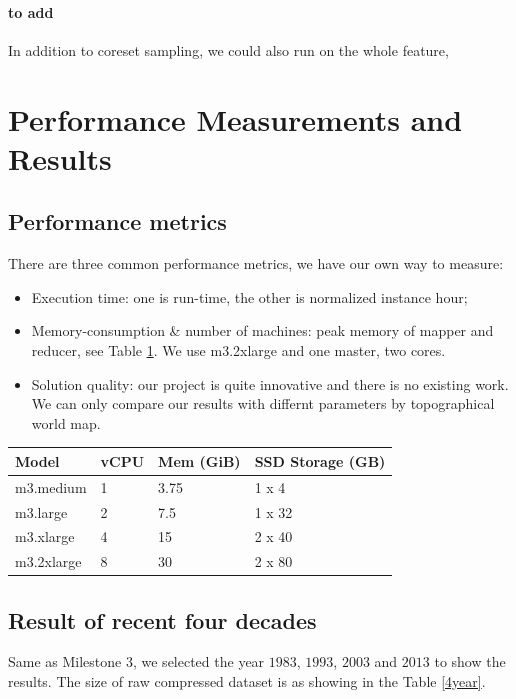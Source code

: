 \paragraph{to add}
In addition to coreset sampling, we could also run on the whole feature, 

\section{Performance Measurements and Results}

\subsection{Performance metrics}
There are three common performance metrics, we have our own way to measure:
\begin{itemize}
    \item Execution time: one is run-time, the other is normalized instance hour;
    \item Memory-consumption \& number of machines: peak memory of mapper and reducer, see Table \ref{table:m3}. We use m3.2xlarge and one master, two cores.
    \item Solution quality: our project is quite innovative and there is no existing work. We can only compare our results with differnt parameters by topographical world map\cite{world}.
\end{itemize}

\begin{table}
    \centering
    \label{table:m3}
    \begin{tabular}{|l|l|l|l|}
        \hline
        Model & vCPU & Mem (GiB) & SSD Storage (GB) \\
        \hline
        m3.medium & 1 & 3.75 & 1 x 4  \\
        m3.large  & 2 & 7.5 & 1 x 32 \\
        m3.xlarge & 4 & 15 & 2 x 40 \\
        m3.2xlarge& 8 & 30 & 2 x 80 \\
        \hline
    \end{tabular}
\end{table}

\subsection{Result of recent four decades}
Same as Milestone $3$, we selected the year $1983$, $1993$, $2003$ and $2013$ to show the results. The size of raw compressed dataset is as showing in the Table \ref{4year}.

